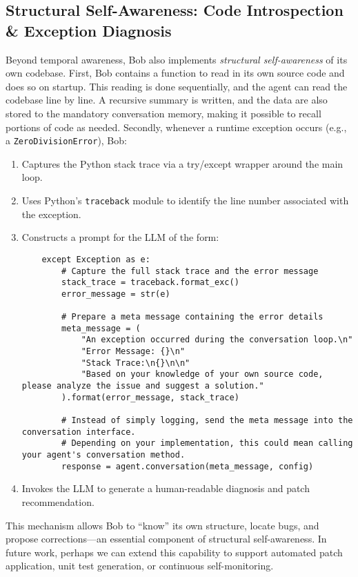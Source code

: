 \documentclass[11pt]{article}
\begin{document}
\subsection{Structural Self-Awareness: Code Introspection \& Exception Diagnosis}
Beyond temporal awareness, Bob also implements \emph{structural self-awareness} of its own codebase. 
First, Bob contains a function to read in its own source code and does so on startup.
This reading is done sequentially, and the agent can read the codebase line by line.  A recursive summary is written, and the data are also stored to the mandatory conversation memory, making it possible to recall portions of code as needed.  Secondly, whenever a runtime exception occurs (e.g., a \texttt{ZeroDivisionError}), Bob:
\begin{enumerate}[leftmargin=*]
  \item Captures the Python stack trace via a try/except wrapper around the main loop.
  \item Uses Python’s \texttt{traceback} module to identify the line number associated with the exception.
  \item Constructs a prompt for the LLM of the form:
  \begin{verbatim} 
    except Exception as e:
        # Capture the full stack trace and the error message
        stack_trace = traceback.format_exc()
        error_message = str(e)
    
        # Prepare a meta message containing the error details
        meta_message = (
            "An exception occurred during the conversation loop.\n"
            "Error Message: {}\n"
            "Stack Trace:\n{}\n\n"
            "Based on your knowledge of your own source code, please analyze the issue and suggest a solution."
        ).format(error_message, stack_trace)
    
        # Instead of simply logging, send the meta message into the conversation interface.
        # Depending on your implementation, this could mean calling your agent's conversation method.
        response = agent.conversation(meta_message, config)
\end{verbatim}
\item Invokes the LLM to generate a human-readable diagnosis and patch recommendation.
\end{enumerate}

This mechanism allows Bob to “know” its own structure, locate bugs, and propose corrections—an essential component of structural self-awareness. In future work, perhaps we can extend this capability to support automated patch application, unit test generation, or continuous self-monitoring.
\end{document}
